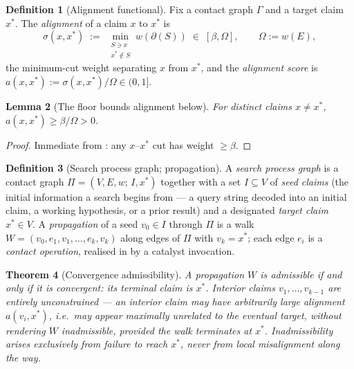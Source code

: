 \documentclass[11pt,twocolumn,a4paper]{article}
\theoremstyle{thmstyle}
\newtheorem{theorem}{Theorem}[section]
\newtheorem{lemma}[theorem]{Lemma}
\theoremstyle{definition}
\newtheorem{definition}[theorem]{Definition}
\theoremstyle{remark}
\newcommand{\Gph}{\Gamma}
\newcommand{\V}{V}
\newcommand{\E}{E}
\newcommand{\wt}{w}
\newcommand{\flo}{\beta}
\newcommand{\cut}{\partial}
\newcommand{\Walk}{W}
\newcommand{\str}{\sigma}
\newcommand{\Proc}{\Pi}
\begin{document}
\begin{definition}[Alignment functional]
\label{def:alignment}
Fix a contact graph $\Gph$ and a target claim $x^{\ast}$. The
\emph{alignment} of a claim $x$ to $x^{\ast}$ is
\[
\str(x,x^{\ast})\;:=\;\min_{\substack{S\ni x\\ x^{\ast}\notin S}}
\wt(\cut(S))\;\in\;[\flo,\Omega],
\qquad \Omega:=\wt(\E),
\]
the minimum-cut weight separating $x$ from $x^{\ast}$, and the
\emph{alignment score} is $a(x,x^{\ast}):=\str(x,x^{\ast})/\Omega\in(0,1]$.
\end{definition}

\begin{lemma}[The floor bounds alignment below]
\label{lem:align-floor}
For distinct claims $x\neq x^{\ast}$, $a(x,x^{\ast})\ge\flo/\Omega>0$.
\end{lemma}

\begin{proof}
Immediate from : any $x$--$x^{\ast}$ cut has weight
$\ge\flo$.
\end{proof}

\begin{definition}[Search process graph; propagation]
\label{def:process}
A \emph{search process graph} is a contact graph
$\Proc=(\V,\E,\wt;\,I,x^{\ast})$ together with a set $I\subseteq\V$ of
\emph{seed claims} (the initial information a search begins from --- a
query string decoded into an initial claim, a working hypothesis, or a
prior result) and a designated \emph{target claim} $x^{\ast}\in\V$. A
\emph{propagation} of a seed $v_0\in I$ through $\Proc$ is a walk
$\Walk=(v_0,e_1,v_1,\dots,e_k,v_k)$ along edges of $\Proc$ with
$v_k=x^{\ast}$; each edge $e_i$ is a \emph{contact operation}, realised in
 by a catalyst invocation.
\end{definition}

\begin{theorem}[Convergence admissibility]
\label{thm:admissibility}
A propagation $\Walk$ is \emph{admissible} if and only if it is
\emph{convergent}: its terminal claim is $x^{\ast}$. Interior claims
$v_1,\dots,v_{k-1}$ are entirely unconstrained --- an interior claim may
have arbitrarily large alignment $a(v_i,x^{\ast})$, i.e.\ may appear
maximally unrelated to the eventual target, without rendering $\Walk$
inadmissible, provided the walk terminates at $x^{\ast}$. Inadmissibility
arises exclusively from failure to reach $x^{\ast}$, never from local
misalignment along the way.
\end{theorem}
\end{document}
